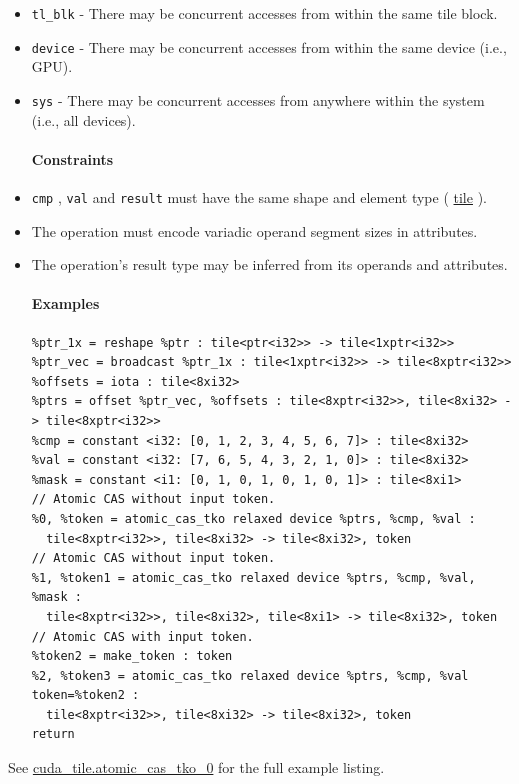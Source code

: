 \documentclass{article}
\begin{document}
\begin{itemize}
\item \texttt{tl\_blk} - There may be concurrent accesses from within the same tile block.
\item \texttt{device} - There may be concurrent accesses from within the same device (i.e., GPU).
\item \texttt{sys} - There may be concurrent accesses from anywhere within the system (i.e., all devices).


\paragraph{Constraints}

\item \texttt{cmp} , \texttt{val} and \texttt{result} must have the same shape and element type ( \href{https://docs.nvidia.com/cuda/tile-ir/latest/sections/types.html#type-tile}{tile} ).
\item The operation must encode variadic operand segment sizes in attributes.
\item The operation's result type may be inferred from its operands and attributes.


\paragraph{Examples}

\begin{lstlisting}
%ptr_1x = reshape %ptr : tile<ptr<i32>> -> tile<1xptr<i32>>
%ptr_vec = broadcast %ptr_1x : tile<1xptr<i32>> -> tile<8xptr<i32>>
%offsets = iota : tile<8xi32>
%ptrs = offset %ptr_vec, %offsets : tile<8xptr<i32>>, tile<8xi32> -> tile<8xptr<i32>>
%cmp = constant <i32: [0, 1, 2, 3, 4, 5, 6, 7]> : tile<8xi32>
%val = constant <i32: [7, 6, 5, 4, 3, 2, 1, 0]> : tile<8xi32>
%mask = constant <i1: [0, 1, 0, 1, 0, 1, 0, 1]> : tile<8xi1>
// Atomic CAS without input token.
%0, %token = atomic_cas_tko relaxed device %ptrs, %cmp, %val :
  tile<8xptr<i32>>, tile<8xi32> -> tile<8xi32>, token
// Atomic CAS without input token.
%1, %token1 = atomic_cas_tko relaxed device %ptrs, %cmp, %val, %mask :
  tile<8xptr<i32>>, tile<8xi32>, tile<8xi1> -> tile<8xi32>, token
// Atomic CAS with input token.
%token2 = make_token : token
%2, %token3 = atomic_cas_tko relaxed device %ptrs, %cmp, %val token=%token2 :
  tile<8xptr<i32>>, tile<8xi32> -> tile<8xi32>, token
return
\end{lstlisting}

\end{itemize}
See \href{https://docs.nvidia.com/cuda/tile-ir/latest/sections/appendix.html#example-cuda-tile-atomic-cas-tko-0}{cuda\_tile.atomic\_cas\_tko\_0} for the full example listing.
\end{document}
